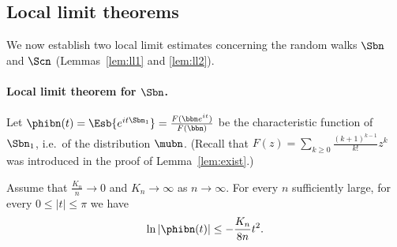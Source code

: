 \subsection{Local limit theorems}
\label{ss:llt}

We now establish two local limit estimates concerning the random walks $\Sbn$ and $\Scn$
(Lemmas~\ref{lem:ll1} and \ref{lem:ll2}).



\paragraph*{Local limit theorem for $\Sbn$.}


Let $\phibn(t)=\Esb{e^{it\Sbn_{1}}}= \tfrac{F( \bbn e^{it})}{F(\bbn)}$  be the characteristic function of $\Sbn_{1}$,
i.e.\ of the distribution $\mubn$.
(Recall that $F(z)=\sum_{k \ge 0} \tfrac{(k+1)^{k-1}}{k!} z^k$ was introduced in the proof of Lemma~\ref{lem:exist}.)

\begin{lemma}\label{lem:phib}
Assume that $\tfrac{K_{n}}{n} \rightarrow 0$ and $K_{n} \rightarrow \infty$ as $n \rightarrow \infty$. For every $n$ sufficiently large, for every $ 0 \leq |t| \leq \pi$  we have
\begin{equation}
\label{eq:phib}  \ln | \phibn (t)| \leq -  \frac{K_{n}}{ 8n} t^{2}.
\end{equation}
\end{lemma}

